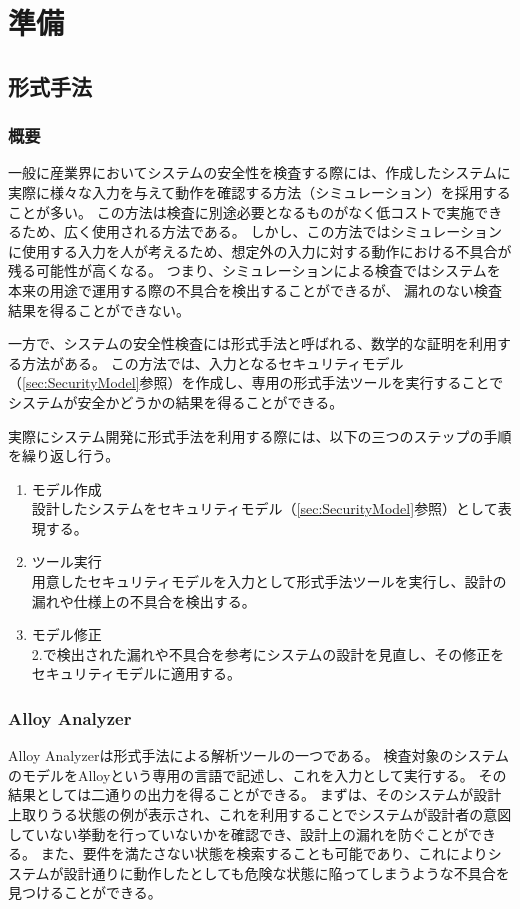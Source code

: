 \documentclass[12pt,a4paper]{jbook}
\begin{document}
\chapter{準備}
\section{形式手法}
\subsection{概要}
一般に産業界においてシステムの安全性を検査する際には、作成したシステムに実際に様々な入力を与えて動作を確認する方法（シミュレーション）を採用することが多い。
この方法は検査に別途必要となるものがなく低コストで実施できるため、広く使用される方法である。
しかし、この方法ではシミュレーションに使用する入力を人が考えるため、想定外の入力に対する動作における不具合が残る可能性が高くなる。
つまり、シミュレーションによる検査ではシステムを本来の用途で運用する際の不具合を検出することができるが、
漏れのない検査結果を得ることができない。

一方で、システムの安全性検査には形式手法と呼ばれる、数学的な証明を利用する方法がある。
この方法では、入力となるセキュリティモデル（\ref{sec:SecurityModel}参照）を作成し、専用の形式手法ツールを実行することでシステムが安全かどうかの結果を得ることができる。

実際にシステム開発に形式手法を利用する際には、以下の三つのステップの手順を繰り返し行う。
\begin{enumerate}
\item モデル作成\\
設計したシステムをセキュリティモデル（\ref{sec:SecurityModel}参照）として表現する。
\item ツール実行\\
用意したセキュリティモデルを入力として形式手法ツールを実行し、設計の漏れや仕様上の不具合を検出する。
\item モデル修正\\
2.で検出された漏れや不具合を参考にシステムの設計を見直し、その修正をセキュリティモデルに適用する。
\end{enumerate}

\subsection{Alloy Analyzer}
Alloy Analyzerは形式手法による解析ツールの一つである。
検査対象のシステムのモデルをAlloyという専用の言語で記述し、これを入力として実行する。
その結果としては二通りの出力を得ることができる。
まずは、そのシステムが設計上取りうる状態の例が表示され、これを利用することでシステムが設計者の意図していない挙動を行っていないかを確認でき、設計上の漏れを防ぐことができる。
また、要件を満たさない状態を検索することも可能であり、これによりシステムが設計通りに動作したとしても危険な状態に陥ってしまうような不具合を見つけることができる。
\end{document}
